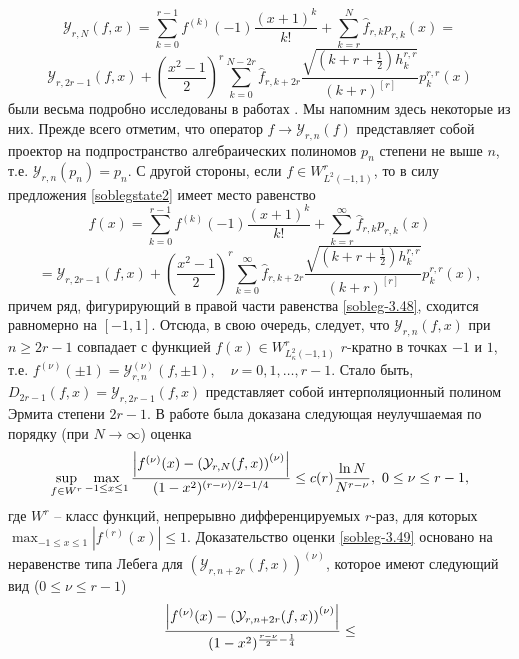 $$
\mathcal{ Y}_{r,N}(f,x)=\sum_{k=0}^{r-1} f^{(k)}(-1)\frac{(x+1)^k}{k!}+\sum_{k=r}^N \hat f_{r,k}p_{r,k}(x)=
$$
\begin{equation}\label{sobleg-3.47}
\mathcal{ Y}_{r,2r-1}(f,x)+\left(\frac{x^2-1}2\right)^r\sum_{k=0}^{N-2r}\hat f_{r,k+2r} \frac{\sqrt{(k+r+\frac12)h_k^{r,r}}}{ (k+r)^{[r]}}p_{k}^{r,r}(x)
\end{equation}
были весьма подробно исследованы в работах \cite{sobleg-Shar11, sobleg-Shar12, sobleg-Shar13, sobleg-Shar15, sobleg-Shar16, sobleg-Shar17, sobleg-Shar18, sobleg-sharap3}. Мы напомним здесь некоторые из них. Прежде всего отметим, что оператор  $f\to \mathcal{ Y}_{r,n}(f)$ представляет собой проектор на подпространство алгебраических полиномов $p_n$ степени не выше $n$, т.е. $\mathcal{ Y}_{r,n}(p_n)=p_n$. С другой стороны, если $f\in W^r_{L^2(-1,1)}$, то в силу предложения \ref{soblegstate2} имеет место равенство
$$
f(x)=\sum_{k=0}^{r-1} f^{(k)}(-1)\frac{(x+1)^k}{k!}+\sum_{k=r}^\infty \hat f_{r,k}p_{r,k}(x)
$$
\begin{equation}\label{sobleg-3.48}
=\mathcal{ Y}_{r,2r-1}(f,x)+\left(\frac{x^2-1}2\right)^r\sum_{k=0}^\infty\hat f_{r,k+2r} \frac{\sqrt{(k+r+\frac12)h_k^{r,r}}}{ (k+r)^{[r]}}p_{k}^{r,r}(x),
\end{equation}
причем ряд, фигурирующий в правой части равенства \eqref{sobleg-3.48}, сходится равномерно на $[-1,1]$. Отсюда, в свою очередь, следует, что   $\mathcal{ Y}_{r,n}(f,x)$ при $n\ge2r-1 $ совпадает с функцией $f(x)\in W^r_{L^2_\kappa(-1,1)}$ $r$-кратно в точках $-1$ и $1$, т.е. $f^{(\nu)}(\pm1)=\mathcal{ Y}_{r,n}^{(\nu)}(f,\pm1),\quad \nu=0,1,\ldots, r-1$. Стало быть,
 $D_{2r-1}(f,x)=\mathcal{ Y}_{r,2r-1}(f,x)$
представляет собой \cite{sobleg-Shar17} интерполяционный полином Эрмита степени $2r-1$.
В работе \cite{sobleg-Shar15}  была доказана следующая неулучшаемая по порядку (при $N\to\infty$) оценка
\begin{equation}\label{sobleg-3.49}
\sup_{f\in W^r}\max_{-1\le x\le 1}{\left|f^{(\nu)}(x)-\left(\mathcal{ Y}_{r,N}(f,x)\right)^{(\nu)}\right|\over(1-x^2)^{(r-\nu)/2-1/4}}
\le c(r)\frac{\ln N}{N^{r-\nu}},\,\, 0\le \nu\le r-1,
\end{equation}
где  $W^r$ -- класс функций, непрерывно дифференцируемых $r$-раз, для которых $\max_{-1\le x\le 1}|f^{(r)}(x)|\le1$.
Доказательство оценки \eqref{sobleg-3.49}  основано \cite{sobleg-Shar15} на неравенстве типа Лебега для $(\mathcal{ Y}_{r,n+2r}(f,x))^{(\nu)}$, которое имеют следующий вид ($0\le\nu\le r-1$)
$$
{\left|f^{(\nu)}(x)-\left(\mathcal{ Y}_{r,n+2r}(f,x)\right)^{(\nu)}\right|
\over(1-x^2)^{\frac{r-\nu}{2}-\frac14}}\le
$$
